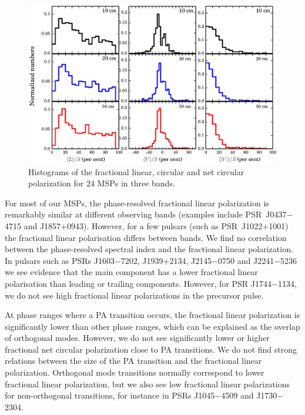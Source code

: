\documentclass[useAMS,usenatbib]{mn2e}
\begin{document}
\begin{figure}
\begin{center}
\includegraphics[width=5.5 in]{polHist.ps}
\caption{Histograms of the fractional linear, circular and net circular polarization 
for $24$ MSPs in three bands.}
\label{polHist}
\end{center}
\end{figure}

For most of our MSPs, the phase-resolved fractional linear polarization is remarkably 
similar at different observing bands (examples include PSR~J0437$-$4715 and J1857$+$0943). 
However, for a few pulsars (such as PSR~J1022$+$1001) the fractional linear polarisation 
differs between bands. We find no correlation between the phase-resolved spectral index 
and the fractional linear polarization. 
%
In pulsars such as PSRs J1603$-$7202, J1939$+$2134, J2145$-$0750 and J2241$-$5236 
we see evidence that the main component has a lower fractional linear polarisation 
than leading or trailing components. However, for PSR J1744$-$1134, we do not see high 
fractional linear polarizations in the precursor pulse.
%

At phase ranges where a PA transition occurs, the fractional linear 
polarization is significantly lower than other phase ranges, which can be explained as 
the overlap of orthogonal modes. However, we do not see significantly lower or higher 
fractional net circular polarization close to PA transitions.
%
We do not find strong relations between the size of the PA transition and 
the fractional linear polarization. Orthogonal mode transitions normally correspond 
to lower fractional linear polarization, but we also see low fractional linear 
polarizations for non-orthogonal transitions, for instance in PSRs J1045$-$4509 
and J1730$-$2304. 
%
\end{document}
